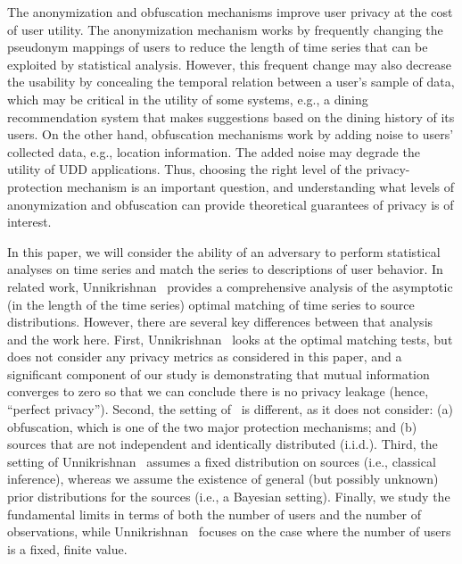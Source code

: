 The anonymization and obfuscation mechanisms improve user privacy at the cost of user utility. The anonymization mechanism works by frequently changing the pseudonym mappings of users to reduce the length of time series that can be exploited by statistical analysis.  However, this frequent change may also decrease the usability by concealing the temporal relation between a user's sample of data, which may be critical in the utility of some systems, e.g., a dining recommendation system that makes suggestions based on the dining history of its users. On the other hand, obfuscation mechanisms work by adding noise to users' collected data, e.g., location information. The added noise may degrade the utility of UDD applications.  Thus, choosing the right level of the privacy-protection mechanism is an important question, and understanding what levels of anonymization and obfuscation can provide theoretical guarantees of privacy is of interest.


In this paper, we will consider the ability of an adversary to perform statistical analyses on time series and match the series to descriptions of user behavior. In related work, Unnikrishnan~\cite{matching} provides a comprehensive analysis of the asymptotic (in the length of the time series) optimal matching of time series to source distributions. However, there are several key differences between that analysis and the work here. First, Unnikrishnan~\cite{matching} looks at the optimal matching tests, but does not consider any privacy metrics as considered in this paper, and a significant component of our study is demonstrating that mutual information converges to zero so that we can conclude there is no privacy leakage (hence, ``perfect privacy'').  Second, the setting of~\cite{matching} is different, as it does not consider: (a) obfuscation, which is one of the two major protection mechanisms; and (b) sources that are not independent and identically distributed (i.i.d.). Third, the setting of Unnikrishnan~\cite{matching} assumes a fixed distribution on sources (i.e., classical inference), whereas we assume the existence of general (but possibly unknown) prior distributions for the sources (i.e., a Bayesian setting).  Finally, we study the fundamental limits in terms of both the number of users and the number of observations, while Unnikrishnan~\cite{matching} focuses on the case where the number of users is a fixed, finite value.

